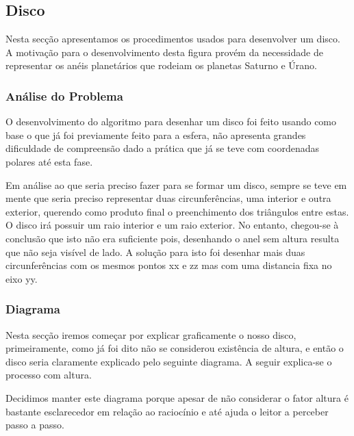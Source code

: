 \newpage
\subsection{Disco}
Nesta secção apresentamos os procedimentos usados para desenvolver um disco. A motivação para o desenvolvimento desta figura provém da necessidade de representar os anéis planetários que rodeiam os planetas Saturno e Úrano.


\subsubsection{Análise do Problema}
O desenvolvimento do algoritmo para desenhar um disco foi feito usando como base o que já foi previamente feito para a esfera, não apresenta grandes dificuldade de compreensão dado a prática que já se teve com coordenadas polares até esta fase. 

Em análise ao que seria preciso fazer para se formar um disco, sempre se teve em mente que seria preciso representar duas circunferências, uma interior e outra exterior, querendo como produto final o preenchimento dos triângulos entre estas. O disco irá possuir um raio interior e um raio exterior. No entanto, chegou-se à conclusão que isto não era suficiente pois, desenhando o anel sem altura resulta que não seja visível de lado. A solução para isto foi desenhar mais duas circunferências com os mesmos pontos xx e zz mas com uma distancia fixa no eixo yy. 

\newpage
\subsubsection{Diagrama}

Nesta secção iremos começar por explicar graficamente o nosso disco, primeiramente, como já foi dito não se considerou existência de altura, e então o disco seria claramente explicado pelo seguinte diagrama. A seguir explica-se o processo com altura.

Decidimos manter este diagrama porque apesar de não considerar o fator altura é bastante esclarecedor em relação ao raciocínio e até ajuda o leitor a perceber passo a passo. 



